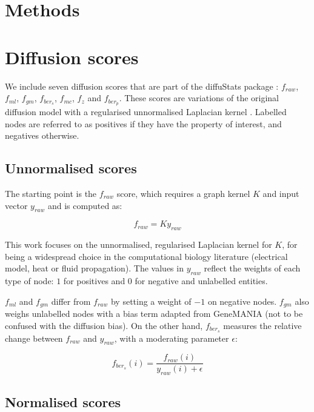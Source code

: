 \documentclass[final]{bioinfo}
\begin{document}
\begin{methods}
\section{Methods}

\section*{Diffusion scores}

We include seven diffusion scores that are part of the diffuStats package \citep{diffustats}: $f_{raw}$, $f_{ml}$, $f_{gm}$, $f_{ber_s}$, $f_{mc}$, $f_{z}$ and $f_{ber_p}$. 
These scores are variations of the original diffusion model with a regularised unnormalised Laplacian kernel \citep{smola}. 
Labelled nodes are referred to as positives if they have the property of interest, and negatives otherwise. 

\subsection*{Unnormalised scores}

The starting point is the $f_{raw}$ score, which requires a graph kernel $K$ \citep{smola} and input vector $y_{raw}$ and is computed as:

\begin{equation}\label{eq:f-raw}
    f_{raw} = K y_{raw}
\end{equation}

This work focuses on the unnormalised, regularised Laplacian kernel for $K$, for being a widespread choice in the computational biology literature (electrical model, heat or fluid propagation).
The values in $y_{raw}$ reflect the weights of each type of node: $1$ for positives and $0$ for negative and unlabelled entities. 

$f_{ml}$ and $f_{gm}$ differ from $f_{raw}$ by setting a weight of $-1$ on negative nodes. 
$f_{gm}$ also weighs unlabelled nodes with a bias term adapted from GeneMANIA (not to be confused with the diffusion bias). 
On the other hand, $f_{ber_s}$ measures the relative change between $f_{raw}$ and $y_{raw}$, with a moderating parameter $\epsilon$: 

\begin{equation}\label{eq:f-ber-s}
    f_{ber_s}(i) = \frac{f_{raw}(i)}{y_{raw}(i) + \epsilon}
\end{equation}

\subsection*{Normalised scores}


\end{methods}
\end{document}
